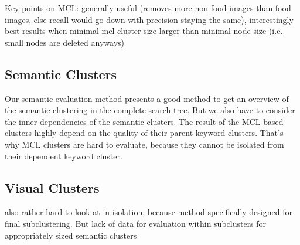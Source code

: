 \bigskip
Key points on MCL: generally useful (removes more non-food images than food images, else recall would go down with precision staying the same), interestingly best results when minimal mcl cluster size larger than minimal node size (i.e. small nodes are deleted anyways)

\subsection{Semantic Clusters}
Our semantic evaluation method presents a good method to get an overview of the semantic clustering in the complete search tree. But we also have to consider the inner dependencies of the semantic clusters. The result of the MCL based clusters highly depend on the quality of their parent keyword clusters. That's why MCL clusters are hard to evaluate, because they cannot be isolated from their dependent keyword cluster.\\

\subsection{Visual Clusters}
also rather hard to look at in isolation, because method specifically designed for final subclustering. But lack of data for evaluation within subclusters for appropriately sized semantic clusters